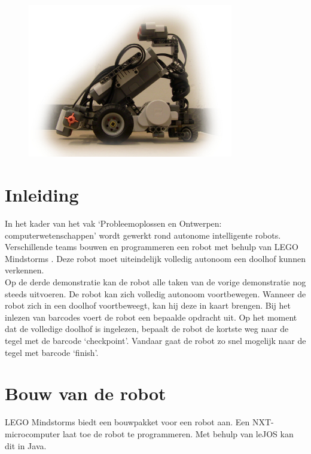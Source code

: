 \documentclass[eind]{penoverslag}
\begin{document}
\begin{figure}[!hb]
\begin{flushright}
    \includegraphics[width=0.8\textwidth]{robotFP}
    \label{fig:robotFP}
\end{flushright}
\end{figure}

\newpage

\tableofcontents
\listoftables
\listoffigures
\thispagestyle{empty}

\newpage 

\section{Inleiding} %
\label{ssec:inl}
In het kader van het vak `Probleemoplossen en Ontwerpen: computerwetenschappen' wordt gewerkt rond autonome intelligente robots. Verschillende teams bouwen en programmeren een robot met behulp van LEGO Mindstorms \cite{mindstorms}. Deze robot moet uiteindelijk volledig autonoom een doolhof kunnen verkennen.\\

Op de derde demonstratie kan de robot alle taken van de vorige demonstratie nog steeds uitvoeren. De robot kan zich volledig autonoom voortbewegen. Wanneer de robot zich in een doolhof voortbeweegt, kan hij deze in kaart brengen. Bij het inlezen van barcodes voert de robot een bepaalde opdracht uit. Op het moment dat de volledige doolhof is ingelezen, bepaalt de robot de kortste weg naar de tegel met de barcode `checkpoint'. Vandaar gaat de robot zo snel mogelijk naar de tegel met barcode `finish'.

\section{Bouw van de robot} %
\label{sec:bouw}
LEGO Mindstorms \cite{mindstorms} biedt een bouwpakket voor een robot aan. Een NXT-microcomputer laat toe de robot te programmeren. Met behulp van leJOS \cite{leJOS} kan dit in Java.
\end{document}
